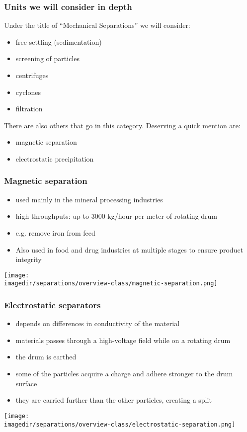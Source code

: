 \begin{frame}\frametitle{Units we will consider in depth}
	Under the title of ``Mechanical Separations'' we will consider:
	\begin{itemize}
		\item	free settling (sedimentation)
		\item	screening of particles
		\item	centrifuges
		\item	cyclones
		\item	filtration
	\end{itemize}

	\vspace{12pt}
	There are also others that go in this category. Deserving a quick mention are:
	\begin{itemize}
		\item	magnetic separation
		\item	electrostatic precipitation
	\end{itemize}
\end{frame}

\begin{frame}\frametitle{{\color{myGreen}{Quick mention:}} Magnetic separation}
	\begin{itemize}
		\item	used mainly in the mineral processing industries
		\item	high throughputs: up to 3000 kg/hour per meter of rotating drum
		\item	e.g. remove iron from feed
		\item	Also used in food and drug industries at multiple stages to ensure product integrity
	\end{itemize}

	\begin{center}
		\texttt{[image: \\imagedir/separations/overview-class/magnetic-separation.png]}
	\end{center}
\end{frame}

\begin{frame}\frametitle{{\color{myGreen}{Quick mention:}} Electrostatic separators}

	\begin{itemize}
		\item	depends on differences in conductivity of the material
		\item	materials passes through a high-voltage field while on a rotating drum
		\item	the drum is earthed
		\item	some of the particles acquire a charge and adhere stronger to the drum surface
		\item	they are carried further than the other particles, creating a split
	\end{itemize}

	\begin{center}
		\texttt{[image: \\imagedir/separations/overview-class/electrostatic-separation.png]}
	\end{center}
\end{frame}

